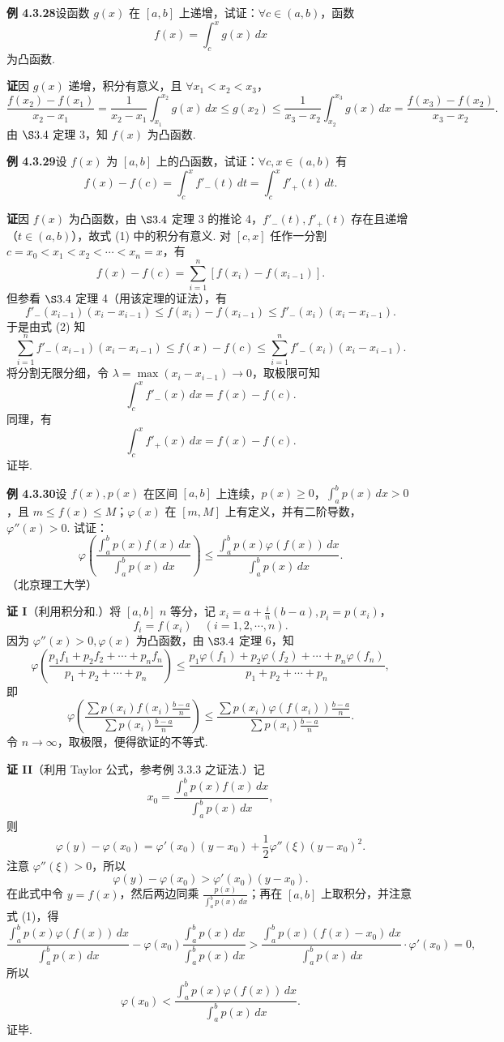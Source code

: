 \documentclass[UTF8, 12pt, fontset=fandol, oneside]{ctexart}
\begin{document}
\noindent\textbf{例 4.3.28}\quad 设函数 $g(x)$ 在 $[a,b]$ 上递增，试证：$\forall c\in(a,b)$，函数
\[
f(x)=\int_c^x g(x)\,dx
\]
为凸函数.

\noindent\textbf{证}\quad 因 $g(x)$ 递增，积分有意义，且 $\forall x_1<x_2<x_3$，
\[
\frac{f(x_2)-f(x_1)}{x_2-x_1}
=\frac1{x_2-x_1}\int_{x_1}^{x_2}g(x)\,dx
\le g(x_2)
\le\frac1{x_3-x_2}\int_{x_2}^{x_3}g(x)\,dx
=\frac{f(x_3)-f(x_2)}{x_3-x_2}.
\]
由 $\S3.4$ 定理 3，知 $f(x)$ 为凸函数.

\noindent\textbf{例 4.3.29}\quad 设 $f(x)$ 为 $[a,b]$ 上的凸函数，试证：$\forall c,x\in(a,b)$ 有
\[
f(x)-f(c)=\int_c^x f'_{-}(t)\,dt
=\int_c^x f'_{+}(t)\,dt.
\tag{1}
\]

\noindent\textbf{证}\quad 因 $f(x)$ 为凸函数，由 $\S3.4$ 定理 3 的推论 4，$f'_{-}(t),f'_{+}(t)$ 存在且递增（$t\in(a,b)$），故式 (1) 中的积分有意义. 对 $[c,x]$ 任作一分割 $c=x_0<x_1<x_2<\cdots<x_n=x$，有
\[
f(x)-f(c)=\sum_{i=1}^n[f(x_i)-f(x_{i-1})].
\tag{2}
\]
但参看 $\S3.4$ 定理 4（用该定理的证法），有
\[
f'_{-}(x_{i-1})(x_i-x_{i-1})
\le f(x_i)-f(x_{i-1})
\le f'_{-}(x_i)(x_i-x_{i-1}).
\]
于是由式 (2) 知
\[
\sum_{i=1}^n f'_{-}(x_{i-1})(x_i-x_{i-1})
\le f(x)-f(c)
\le\sum_{i=1}^n f'_{-}(x_i)(x_i-x_{i-1}).
\]
将分割无限分细，令 $\lambda=\max(x_i-x_{i-1})\to0$，取极限可知
\[
\int_c^x f'_{-}(x)\,dx=f(x)-f(c).
\]
同理，有
\[
\int_c^x f'_{+}(x)\,dx=f(x)-f(c).
\]
证毕.

\noindent\textbf{例 4.3.30}\quad 设 $f(x),p(x)$ 在区间 $[a,b]$ 上连续，$p(x)\ge0$，$\int_a^b p(x)\,dx>0$，且 $m\le f(x)\le M$；$\varphi(x)$ 在 $[m,M]$ 上有定义，并有二阶导数，$\varphi''(x)>0$. 试证：
\[
\varphi\left(\frac{\int_a^b p(x)f(x)\,dx}{\int_a^b p(x)\,dx}\right)
\le
\frac{\int_a^b p(x)\varphi(f(x))\,dx}{\int_a^b p(x)\,dx}.
\]
（北京理工大学）

\noindent\textbf{证 I}\quad （利用积分和.）将 $[a,b]$ $n$ 等分，记 $x_i=a+\frac{i}{n}(b-a),p_i=p(x_i)$，
\[
f_i=f(x_i)\quad(i=1,2,\cdots,n).
\]
因为 $\varphi''(x)>0,\varphi(x)$ 为凸函数，由 $\S3.4$ 定理 6，知
\[
\varphi\left(\frac{p_1f_1+p_2f_2+\cdots+p_nf_n}{p_1+p_2+\cdots+p_n}\right)
\le
\frac{p_1\varphi(f_1)+p_2\varphi(f_2)+\cdots+p_n\varphi(f_n)}
{p_1+p_2+\cdots+p_n},
\]
即
\[
\varphi\left(
\frac{\sum p(x_i)f(x_i)\frac{b-a}{n}}
{\sum p(x_i)\frac{b-a}{n}}
\right)
\le
\frac{\sum p(x_i)\varphi(f(x_i))\frac{b-a}{n}}
{\sum p(x_i)\frac{b-a}{n}}.
\]
令 $n\to\infty$，取极限，便得欲证的不等式.

\noindent\textbf{证 II}\quad （利用 Taylor 公式，参考例 3.3.3 之证法.）记
\[
x_0=\frac{\int_a^b p(x)f(x)\,dx}{\int_a^b p(x)\,dx},
\tag{1}
\]
则
\[
\varphi(y)-\varphi(x_0)
=\varphi'(x_0)(y-x_0)+\frac12\varphi''(\xi)(y-x_0)^2.
\]
注意 $\varphi''(\xi)>0$，所以
\[
\varphi(y)-\varphi(x_0)>\varphi'(x_0)(y-x_0).
\]
在此式中令 $y=f(x)$，然后两边同乘 $\frac{p(x)}{\int_a^b p(x)\,dx}$；再在 $[a,b]$ 上取积分，并注意式 (1)，得
\[
\frac{\int_a^b p(x)\varphi(f(x))\,dx}{\int_a^b p(x)\,dx}
-\varphi(x_0)\frac{\int_a^b p(x)\,dx}{\int_a^b p(x)\,dx}
>
\frac{\int_a^b p(x)(f(x)-x_0)\,dx}{\int_a^b p(x)\,dx}\cdot\varphi'(x_0)=0,
\]
所以
\[
\varphi(x_0)<\frac{\int_a^b p(x)\varphi(f(x))\,dx}{\int_a^b p(x)\,dx}.
\]
证毕.
\end{document}
